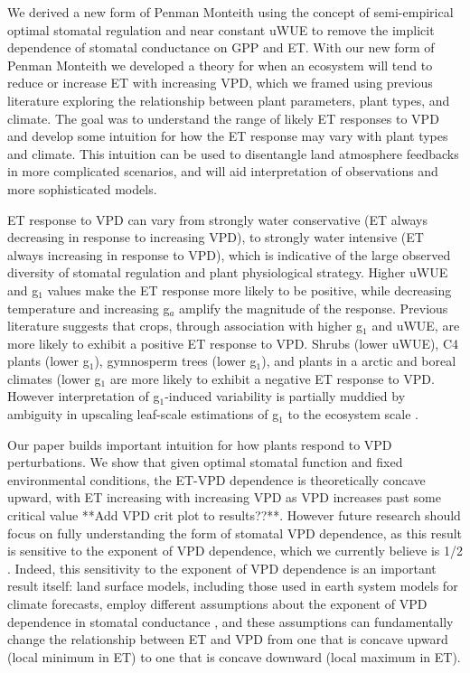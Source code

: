 We derived a new form of Penman Monteith using the concept of
semi-empirical optimal stomatal regulation \citep{Lin_2015,
MEDLYN_2011} and near constant uWUE \citep{Zhou_2015} to remove the
implicit dependence of stomatal conductance on GPP and ET. With our
new form of Penman Monteith we developed a theory for when an
ecosystem will tend to reduce or increase ET with increasing VPD,
which we framed using previous literature exploring the relationship
between plant parameters, plant types, and climate. The goal was to
understand the range of likely ET responses to VPD and develop some
intuition for how the ET response may vary with plant types and
climate. This intuition can be used to disentangle land atmosphere
feedbacks in more complicated scenarios, and will aid interpretation
of observations and more sophisticated models.

ET response to VPD can vary from strongly water conservative (ET
always decreasing in response to increasing VPD), to strongly water
intensive (ET always increasing in response to VPD), which is
indicative of the large observed diversity of stomatal regulation and
plant physiological strategy. Higher uWUE and g$_1$ values make the ET
response more likely to be positive, while decreasing temperature and
increasing g$_a$ amplify the magnitude of the response. Previous
literature \citep{Zhou_2015, Lin_2015} suggests that crops, through
association with higher g$_1$ and uWUE, are more likely to exhibit a
positive ET response to VPD. Shrubs (lower uWUE), C4 plants (lower
g$_1$), gymnosperm trees (lower g$_1$), and plants in a arctic and
boreal climates (lower g$_1$ are more likely to exhibit a negative ET
response to VPD. However interpretation of g$_1$-induced variability
is partially muddied by ambiguity in upscaling leaf-scale estimations
of g$_1$ to the ecosystem scale \citep{Medlyn_2017}.

Our paper builds important intuition for how plants respond to VPD
perturbations. We show that given optimal stomatal function and fixed
environmental conditions, the ET-VPD dependence is theoretically
concave upward, with ET increasing with increasing VPD as VPD
increases past some critical value **Add VPD crit plot to
results??**. However future research should focus on fully
understanding the form of stomatal VPD dependence, as this result is
sensitive to the exponent of VPD dependence, which we currently
believe is 1/2 \citep{MEDLYN_2011, Zhou_2014}. Indeed, this
sensitivity to the exponent of VPD dependence is an important result
itself: land surface models, including those used in earth system
models for climate forecasts, employ different assumptions about the
exponent of VPD dependence in stomatal conductance
\citep[e.g.,][]{Ball_1987, Leuning_1990, MEDLYN_2011}, and these
assumptions can fundamentally change the relationship between ET and
VPD from one that is concave upward (local minimum in ET) to one that
is concave downward (local maximum in ET).

